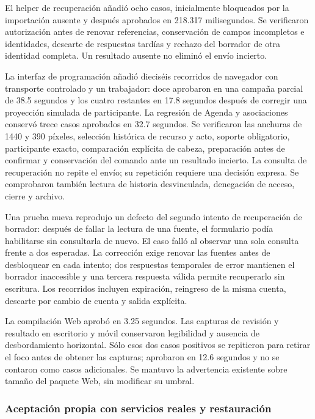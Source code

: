 El helper de recuperación añadió ocho casos, inicialmente bloqueados por la importación ausente y después aprobados en 218.317 milisegundos. Se verificaron autorización antes de renovar referencias, conservación de campos incompletos e identidades, descarte de respuestas tardías y rechazo del borrador de otra identidad completa. Un resultado ausente no eliminó el envío incierto.

La interfaz de programación añadió dieciséis recorridos de navegador con transporte controlado y un trabajador: doce aprobaron en una campaña parcial de 38.5 segundos y los cuatro restantes en 17.8 segundos después de corregir una proyección simulada de participante. La regresión de Agenda y asociaciones conservó trece casos aprobados en 32.7 segundos. Se verificaron las anchuras de 1440 y 390 píxeles, selección histórica de recurso y acto, soporte obligatorio, participante exacto, comparación explícita de cabeza, preparación antes de confirmar y conservación del comando ante un resultado incierto. La consulta de recuperación no repite el envío; su repetición requiere una decisión expresa. Se comprobaron también lectura de historia desvinculada, denegación de acceso, cierre y archivo.

Una prueba nueva reprodujo un defecto del segundo intento de recuperación de borrador: después de fallar la lectura de una fuente, el formulario podía habilitarse sin consultarla de nuevo. El caso falló al observar una sola consulta frente a dos esperadas. La corrección exige renovar las fuentes antes de desbloquear en cada intento; dos respuestas temporales de error mantienen el borrador inaccesible y una tercera respuesta válida permite recuperarlo sin escritura. Los recorridos incluyen expiración, reingreso de la misma cuenta, descarte por cambio de cuenta y salida explícita.

La compilación Web aprobó en 3.25 segundos. Las capturas de revisión y resultado en escritorio y móvil conservaron legibilidad y ausencia de desbordamiento horizontal. Sólo esos dos casos positivos se repitieron para retirar el foco antes de obtener las capturas; aprobaron en 12.6 segundos y no se contaron como casos adicionales. Se mantuvo la advertencia existente sobre tamaño del paquete Web, sin modificar su umbral.

\subsubsection{Aceptación propia con servicios reales y restauración}

